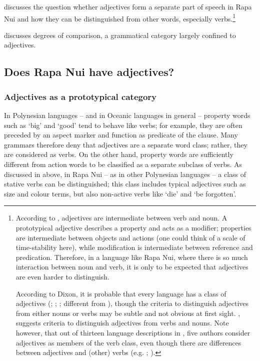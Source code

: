   
 discusses the question whether adjectives form a separate part of speech in Rapa Nui and how they can be distinguished from other words, especially verbs.\footnote{\label{fn:119}According to \citet{Croft2000}, adjectives are intermediate between verb and noun. A prototypical adjective describes a property and acts as a modifier; properties are intermediate between objects and actions (one could think of a scale of time-stability here), while modification is intermediate between reference and predication. Therefore, in a language like Rapa Nui, where there is so much interaction between noun and verb, it is only to be expected that adjectives are even harder to distinguish.

According to Dixon, it is probable that every language has a class of adjectives (\citealt{Dixon2004}; \citealt[53]{Dixon2010-1}; \citealt[62, 104]{Dixon2010-2}; different from \citealt{Dixon1982}), though the criteria to distinguish adjectives from either nouns or verbs may be subtle and not obvious at first sight. \citet{Dixon2004}, \citet[70–73]{Dixon2010-2} suggests criteria to distinguish adjectives from verbs and nouns. Note however, that out of thirteen language descriptions in \citet{AikhenvaldDixon2004}, five authors consider adjectives as members of the verb class, even though there are differences between adjectives and (other) verbs (e.g. \citealt{Hajek2004}; \citealt{Hyslop2004}).}  

 discusses degrees of comparison, a grammatical category largely confined to adjectives.

\subsection{Does Rapa Nui have adjectives?}\label{sec:3.5.1}
\subsubsection[Adjectives as a prototypical category]{Adjectives as a prototypical category}\label{sec:3.5.1.1}
In Polynesian languages – and in Oceanic languages in general – property words such as ‘big’ and ‘good’ tend to behave like verbs; for example, they are often preceded by an aspect marker and function as predicate of the clause. Many grammars therefore deny that adjectives are a separate word class; rather, they are considered as verbs. On the other hand, property words are sufficiently different from action words to be classified as a separate subclass of verbs. As discussed in  above, in Rapa Nui – as in other Polynesian languages – a class of stative verbs can be distinguished; this class includes typical adjectives such as size and colour terms, but also non-active verbs like ‘die’ and ‘be forgotten’. 

